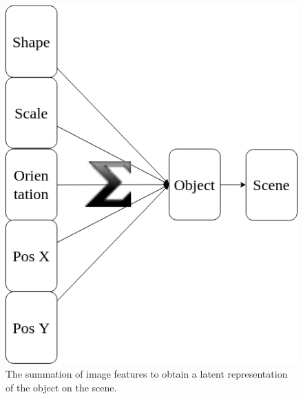 \documentclass{article}
\begin{document}
    \begin{figure}[ht]{\linewidth}
        \begin{minipage}[b]{0.48\textwidth}
            \centering
            \includegraphics[width=\textwidth]{img/model/sum_features_to_scene}
            \caption{The summation of image features to obtain a latent representation of the object on the scene.}
            \label{fig:sum_features_to_scene}

            \vspace*{\baselineskip} %


\end{minipage}
\end{figure}
\end{document}
